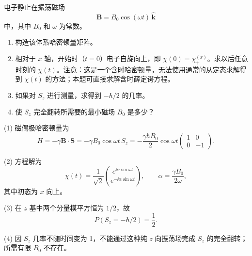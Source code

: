 \begin{question}
电子静止在振荡磁场
\[
\mathbf B=B_0\cos(\omega t)\,\hat{\mathbf k}
\]
中，其中 $B_0$ 和 $\omega$ 为常数。
\begin{enumerate}
\item 构造该体系哈密顿量矩阵。
\item 相对于 $x$ 轴，开始时（$t=0$）电子自旋向上，即 $\chi(0)=\chi_+^{(x)}$。求以后任意时刻的 $\chi(t)$。注意：这是一个含时哈密顿量，无法使用通常的从定态求解得到 $\chi(t)$ 的方法；本题可直接求解含时薛定谔方程。
\item 如果对 $S_z$ 进行测量，求得到 $-\hbar/2$ 的几率。
\item 使 $S_z$ 完全翻转所需要的最小磁场 $B_0$ 是多少？
\end{enumerate}
\end{question}
\begin{solution}

(1) 磁偶极哈密顿量为
\[
H=-\gamma \mathbf B\cdot\mathbf S=-\gamma B_0\cos\omega t\,S_z
=-\frac{\gamma\hbar B_0}{2}\cos\omega t
\begin{pmatrix}1&0\\0&-1\end{pmatrix}.
\]

(2) 方程解为
\[
\chi(t)=\frac1{\sqrt2}\binom{e^{\ii\alpha\sin\omega t}}{e^{-\ii\alpha\sin\omega t}},
\qquad
\alpha=\frac{\gamma B_0}{2\omega},
\]
其中初态为 $x$ 向上。

(3) 在 $z$ 基中两个分量模平方恒为 $1/2$，故
\[
P(S_z=-\hbar/2)=\frac12.
\]

(4) 因 $S_z$ 几率不随时间变为 1，不能通过这种纯 $z$ 向振荡场完成 $S_z$ 的完全翻转；所需有限 $B_0$ 不存在。

\end{solution}

